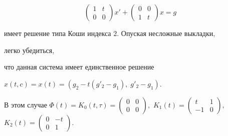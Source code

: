 \begin{exam}


\begin{equation}


\begin{pmatrix}


1 & t\\


0 & 0


\end{pmatrix}


x'+


\begin{pmatrix}


0 & 0\\


1 & t


\end{pmatrix}


x=g


\end{equation}


имеет решение типа Коши индекса 2. Опуская несложные выкладки,


легко убедиться,


что данная система имеет единственное решение


$x(t,c)=x(t)=(g_2-t(g'_2-g_1),\; g'_2-g_1)$.





В этом случае $\Phi(t)=K_0(t,\tau)=


\begin{pmatrix}


0 & 0\\


0 & 0


\end{pmatrix}


,$ $K_1(t)=


\begin{pmatrix}


t & 1\\


-1 & 0


\end{pmatrix}


,$ $K_2(t)=


\begin{pmatrix}


0 & -t\\


0 & 1


\end{pmatrix}


.$


\end{exam}





